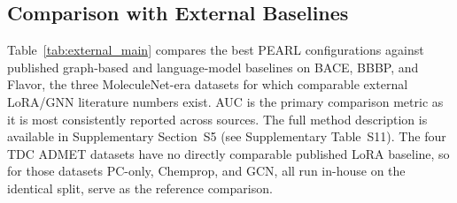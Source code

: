 \documentclass[pdflatex,sn-mathphys-num]{sn-jnl}%
\begin{document}
\subsection{Comparison with External Baselines}\label{sec:external_comparison}
Table~\ref{tab:external_main} compares the best PEARL configurations against published graph-based and language-model baselines on BACE, BBBP, and Flavor, the three MoleculeNet-era datasets for which comparable external LoRA/GNN literature numbers exist. AUC is the primary comparison metric as it is most consistently reported across sources. The full method description is available in Supplementary Section~S5 (see Supplementary Table~S11). The four TDC ADMET datasets have no directly comparable published LoRA baseline, so for those datasets PC-only, Chemprop, and GCN, all run in-house on the identical split, serve as the reference comparison.
\end{document}
